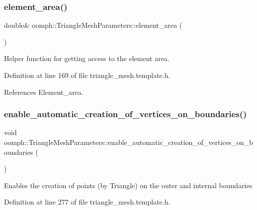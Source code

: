 \subsubsection{\texorpdfstring{element\+\_\+area()}{element\_area()}\hspace{0.1cm}{\footnotesize\ttfamily [2/2]}}
{\footnotesize\ttfamily double\& oomph\+::\+Triangle\+Mesh\+Parameters\+::element\+\_\+area (\begin{DoxyParamCaption}{ }\end{DoxyParamCaption})\hspace{0.3cm}{\ttfamily [inline]}}



Helper function for getting access to the element area. 



Definition at line 169 of file triangle\+\_\+mesh.\+template.\+h.



References Element\+\_\+area.

\mbox{\label{classoomph_1_1TriangleMeshParameters_a6448159477b5b99adcb942c1cbf82a07}} 
\subsubsection{\texorpdfstring{enable\+\_\+automatic\+\_\+creation\+\_\+of\+\_\+vertices\+\_\+on\+\_\+boundaries()}{enable\_automatic\_creation\_of\_vertices\_on\_boundaries()}}
{\footnotesize\ttfamily void oomph\+::\+Triangle\+Mesh\+Parameters\+::enable\+\_\+automatic\+\_\+creation\+\_\+of\+\_\+vertices\+\_\+on\+\_\+boundaries (\begin{DoxyParamCaption}{ }\end{DoxyParamCaption})\hspace{0.3cm}{\ttfamily [inline]}}

Enables the creation of points (by Triangle) on the outer and internal boundaries 

Definition at line 277 of file triangle\+\_\+mesh.\+template.\+h.



